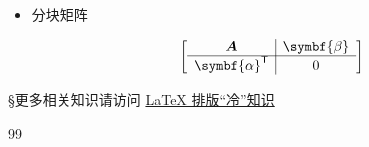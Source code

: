 \documentclass[a4paper, 12pt, UTF8]{ctexart}
\begin{document}
\begin{itemize}
    \[
        \left[
          \begin{array}{c;{2pt/2pt}c}
             \begin{matrix}
                 1 & 12 & 3 & 8 \\
                 14 & 5 & 16 &21\\
                 7 & 18 & 9 &7 \\ \hdashline[2pt/2pt]
                 23 & 0 & -1 &8\\
             \end{matrix} &
             \begin{matrix}
                 1 & 4 \\
                 2 & 5 \\
                 3 & 6 \\ \hdashline[2pt/2pt]
                 13 & 26 \\
             \end{matrix}
          \end{array}
        \right]
     \]

     \item 分块矩阵

     \[
         \begin{bmatrix}
             \begin{array}{c | c}
               \boldsymbol{A}  &  \symbf{\beta}  \\  \hline
               \symbf{\alpha}^{\mathsf T}   &  0
             \end{array}
         \end{bmatrix}
     \]

 \end{itemize}

\S 更多相关知识请访问 \href{https://matnoble.github.io/series/latex/}{\LaTeX{} 排版“冷”知识}

\clearpage
\begin{thebibliography}{99}
\end{thebibliography}

\clearpage
\end{document}

